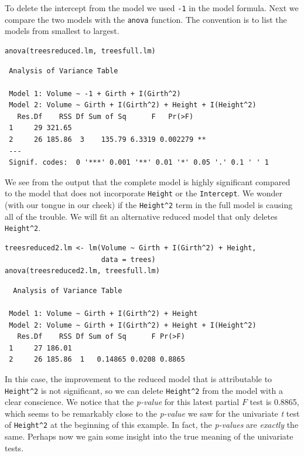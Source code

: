 \documentclass[captions=tableheading]{scrbook}
\begin{document}
\begin{example}
To delete the intercept from the model we used \texttt{-1} in the model formula. Next we compare the two models with the \texttt{anova} function. The convention is to list the models from smallest to largest.


\begin{verbatim}
anova(treesreduced.lm, treesfull.lm)
\end{verbatim}

\begin{verbatim}
 Analysis of Variance Table
 
 Model 1: Volume ~ -1 + Girth + I(Girth^2)
 Model 2: Volume ~ Girth + I(Girth^2) + Height + I(Height^2)
   Res.Df    RSS Df Sum of Sq      F   Pr(>F)   
 1     29 321.65                                
 2     26 185.86  3    135.79 6.3319 0.002279 **
 ---
 Signif. codes:  0 '***' 0.001 '**' 0.01 '*' 0.05 '.' 0.1 ' ' 1
\end{verbatim}

We see from the output that the complete model is highly significant compared to the model that does not incorporate \texttt{Height} or the \texttt{Intercept}. We wonder (with our tongue in our cheek) if the \texttt{Height\textasciicircum{}2} term in the full model is causing all of the trouble. We will fit an alternative reduced model that only deletes \texttt{Height\textasciicircum{}2}. 


\begin{verbatim}
treesreduced2.lm <- lm(Volume ~ Girth + I(Girth^2) + Height, 
                       data = trees)
anova(treesreduced2.lm, treesfull.lm)
\end{verbatim}

\begin{verbatim}
  Analysis of Variance Table
 
 Model 1: Volume ~ Girth + I(Girth^2) + Height
 Model 2: Volume ~ Girth + I(Girth^2) + Height + I(Height^2)
   Res.Df    RSS Df Sum of Sq      F Pr(>F)
 1     27 186.01                           
 2     26 185.86  1   0.14865 0.0208 0.8865
\end{verbatim}

In this case, the improvement to the reduced model that is attributable to \texttt{Height\textasciicircum{}2} is not significant, so we can delete \texttt{Height\textasciicircum{}2} from the model with a clear conscience. We notice that the \emph{p-value} for this latest partial \(F\) test is 0.8865, which seems to be remarkably close to the \emph{p-value} we saw for the univariate \emph{t} test of \texttt{Height\textasciicircum{}2} at the beginning of this example. In fact, the \emph{p-values} are \emph{exactly} the same. Perhaps now we gain some insight into the true meaning of the univariate tests.

\end{example}
\end{document}
